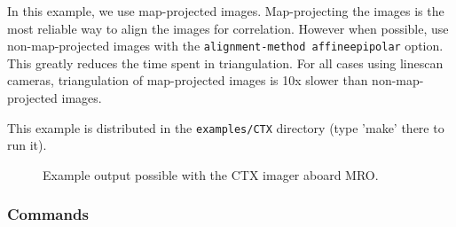 In this example, we use map-projected images. Map-projecting the
images is the most reliable way to align the images for
correlation. However when possible, use non-map-projected images with
the \texttt{alignment-method affineepipolar} option. This greatly reduces
the time spent in triangulation. For all cases using linescan cameras,
triangulation of map-projected images is 10x slower than
non-map-projected images.

This example is distributed in the \texttt{examples/CTX} directory (type
'make' there to run it).

\begin{figure}[b!]
\centering
  \hfil
\caption{Example output possible with the CTX imager aboard MRO.}
\label{fig:ctx_example}
\end{figure}

\subsubsection*{Commands}

